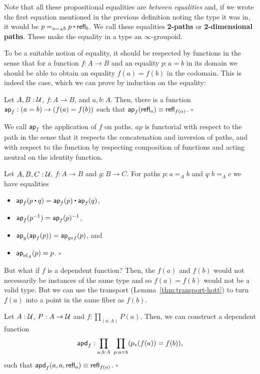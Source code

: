 Note that all these propositional equalities are \emph{between equalities} and,
if we wrote the first equation mentioned in the previous definition noting the
type it was in, it would be $p =_{a =_A b} p \ct \refl_b$.
We call these equalities \textbf{2-paths} or \textbf{2-dimensional paths}.
These make the equality in a type an $\infty$-groupoid.

To be a suitable notion of equality, it should be respected by functions in the
sense that for a function $f : A \to B$ and an equality $p : a = b$ in its domain
we should be able to obtain an equality $f(a) = f(b)$ in the codomain.
This is indeed the case, which we can prove by induction on the equality:
\begin{lemma}
Let $A, B : \mathcal{U}$, $f : A \to B$, and $a, b : A$. Then, there is a function
$\mathsf{ap}_f : (a = b) \to (f(a) = f(b))$ such that $\mathsf{ap}_f(\mathsf{refl}_a) \equiv \mathsf{refl}_{f(a)}$.
\hfill $\square$
\end{lemma}

We call $\mathsf{ap}_f$ the application of $f$ on paths. $ap$ is functorial with respect
to the path in the sense that it respects the concatenation and inversion of
paths, and with respect to the function by respecting composition of functions
and acting neutral on the identity function.

\begin{lemma}
Let $A, B, C : \mathcal{U}$, $f : A \to B$ and $g : B \to C$. For paths $p : a =_A b$ and
$q : b =_A c$ we have equalities
\begin{itemize}
\item $\ap_f(p \ct q) = \ap_f(p) \ct \ap_f(q)$,
\item $\mathsf{ap}_f(p^{-1}) = \mathsf{ap}_f(p)^{-1}$,
\item $\mathsf{ap}_g(\mathsf{ap}_f(p)) = \mathsf{ap}_{g \circ f}(p)$, and
\item $\mathsf{ap}_{\operatorname{id}_A}(p) = p$. \hfill $\square$
\end{itemize}
\end{lemma}

But what if $f$ is a dependent function? Then, the $f(a)$ and $f(b)$ would not
necessarily be instances of the same type and so $f(a) = f(b)$ would not be a
valid type.
But we can use the transport (Lemma~\ref{thm:transport-hott}) to turn $f(a)$ into
a point in the same fiber as $f(b)$.

\begin{lemma}
Let $A : \mathcal{U}$, $P : A \to \mathcal{U}$ and $f : \prod_{(a : A)} P(a)$. Then, we can construct
a dependent function
\begin{equation*}
\mathsf{apd}_f : \prod_{a, b : A} ~ \prod_{p : a = b} (p_*(f(a)) = f(b)) \text{,}
\end{equation*}
such that $\mathsf{apd}_f(a, a, \mathsf{refl}_a) \equiv \mathsf{refl}_{f(a)}$. \hfill $\square$
\end{lemma}

